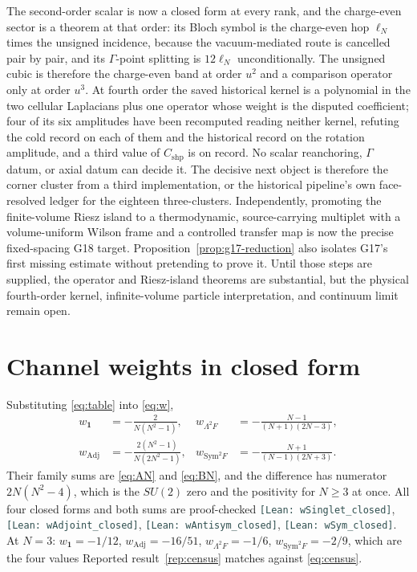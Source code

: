 \documentclass[11pt]{article}
\theoremstyle{plain}
\theoremstyle{definition}
\theoremstyle{remark}
\newcommand{\chk}[1]{}
\newcommand{\leanref}[1]{{\footnotesize\textcolor{DarkSlateGray}{\texttt{[Lean: #1]}}}}
\begin{document}
The second-order scalar is now a closed form at every rank, and the
charge-even sector is a theorem at that order: its Bloch symbol is the
charge-even hop $\ell_N$ times the unsigned incidence, because the
vacuum-mediated route is cancelled pair by pair, and its $\Gamma$-point
splitting is $12\ell_N$ unconditionally. The unsigned cubic is therefore the
charge-even band at order $u^2$ and a comparison operator only at order $u^3$.
At fourth order the saved historical kernel is a polynomial in the two
cellular Laplacians plus one operator whose weight is the disputed
coefficient; four of its six amplitudes have been recomputed reading
neither kernel, refuting the cold record on each of them and the historical
record on the rotation amplitude, and a third value of $C_{\mathrm{shp}}$ is
on record. No scalar reanchoring, $\Gamma$ datum, or axial datum can decide
it. The decisive next object is therefore the corner cluster from a third
implementation, or the historical pipeline's own face-resolved ledger for
the eighteen three-clusters. Independently, promoting
the finite-volume Riesz island to a thermodynamic, source-carrying multiplet
with a volume-uniform Wilson frame and a controlled transfer map is now the
precise fixed-spacing G18 target. Proposition~\ref{prop:g17-reduction} also
isolates G17's first missing estimate without pretending to prove it. Until
those steps are supplied, the operator and Riesz-island theorems are
substantial, but the physical fourth-order kernel, infinite-volume particle
interpretation, and continuum limit remain open.

\appendix

\section{Channel weights in closed form}\label{app:closed}

Substituting \eqref{eq:table} into \eqref{eq:w},
\begingroup\small
\begin{align*}
  w_{\mathbf 1}&=-\frac{2}{N(N^2-1)}, &
  w_{\Lambda^2F}&=-\frac{N-1}{(N+1)(2N-3)},\\
  w_{\mathrm{Adj}}&=-\frac{2(N^2-1)}{N(2N^2-1)}, &
  w_{\mathrm{Sym}^2F}&=-\frac{N+1}{(N-1)(2N+3)} .
\end{align*}
\endgroup
Their family sums are \eqref{eq:AN} and \eqref{eq:BN}, and the difference has
numerator $2N(N^2-4)$, which is the $SU(2)$ zero and the positivity for
$N\ge3$ at once. All four closed forms and both sums are proof-checked
\leanref{wSinglet\_closed}, \leanref{wAdjoint\_closed},
\leanref{wAntisym\_closed}, \leanref{wSym\_closed}.
\chk{the four channel weights follow from dimension and Casimir} At $N=3$:
$w_{\mathbf 1}=-1/12$, $w_{\mathrm{Adj}}=-16/51$, $w_{\Lambda^2F}=-1/6$,
$w_{\mathrm{Sym}^2F}=-2/9$, which are the four values
Reported result~\ref{rep:census} matches against \eqref{eq:census}.
\end{document}
